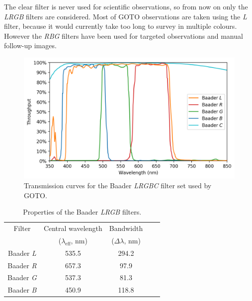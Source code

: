 \begin{colsection}
\begin{colsection}
The clear filter is never used for scientific observations, so from now on only the \textit{LRGB} filters are considered. Most of GOTO observations are taken using the \textit{L} filter, because it would currently take too long to survey in multiple colours. However the \textit{RBG} filters have been used for targeted observations and manual follow-up images.

\begin{figure}[t]
    \begin{center}
        \includegraphics[width=\textwidth]{images/throughput/trans_filters.png}
    \end{center}
    \caption[Baader filter transmission curves]{
        Transmission curves for the Baader \textit{LRGBC} filter set used by GOTO.\
    }\label{fig:filters}
\end{figure}

\newpage

\begin{table}[t]
    \begin{center}
        \begin{tabular}{c|cccc} %
            Filter            & Central wavelength                          & Bandwidth            \\
                              & ($\lambda_\text{eff}$, nm) & ($\Delta\lambda$, nm) \\
            \midrule
            Baader \textit{L} & 535.5 & 294.2 \\
            Baader \textit{R} & 657.3 &  97.9 \\
            Baader \textit{G} & 537.3 &  81.3 \\
            Baader \textit{B} & 450.9 & 118.8 \\
        \end{tabular}
    \end{center}
    \caption[Baader filter properties]{
        Properties of the Baader \textit{LRGB} filters.
    }\label{tab:filters}
\end{table}


\end{colsection}
\end{colsection}
